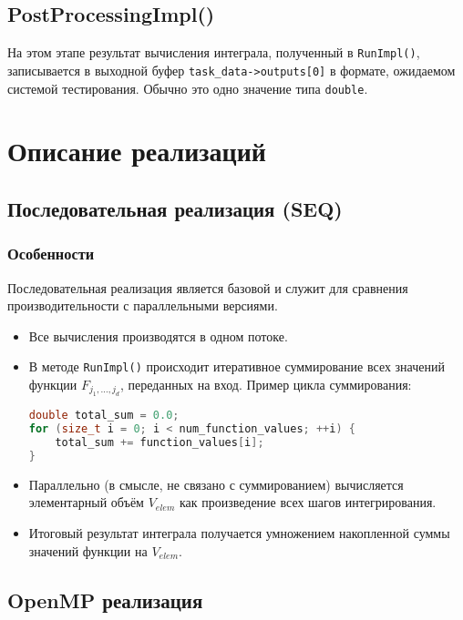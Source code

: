 \documentclass[12pt]{article}
\begin{document}
\subsection*{PostProcessingImpl()}
На этом этапе результат вычисления интеграла, полученный в \texttt{RunImpl()}, записывается в выходной буфер \texttt{task\_data->outputs[0]} в формате, ожидаемом системой тестирования. Обычно это одно значение типа \texttt{double}.
\newpage

\section{Описание реализаций}

\subsection{Последовательная реализация (SEQ)}
\subsubsection*{Особенности}
Последовательная реализация является базовой и служит для сравнения производительности с параллельными версиями.
\begin{itemize}
  \item Все вычисления производятся в одном потоке.
  \item В методе \texttt{RunImpl()} происходит итеративное суммирование всех значений функции $F_{j_1, \dots, j_d}$, переданных на вход. Пример цикла суммирования:
\begin{lstlisting}[language=C++, basicstyle=\small\ttfamily, frame=none, numbers=none]
double total_sum = 0.0;
for (size_t i = 0; i < num_function_values; ++i) {
    total_sum += function_values[i];
}
\end{lstlisting}
  \item Параллельно (в смысле, не связано с суммированием) вычисляется элементарный объём $V_{elem}$ как произведение всех шагов интегрирования.
  \item Итоговый результат интеграла получается умножением накопленной суммы значений функции на $V_{elem}$.
\end{itemize}

\subsection{OpenMP реализация}
\end{document}
